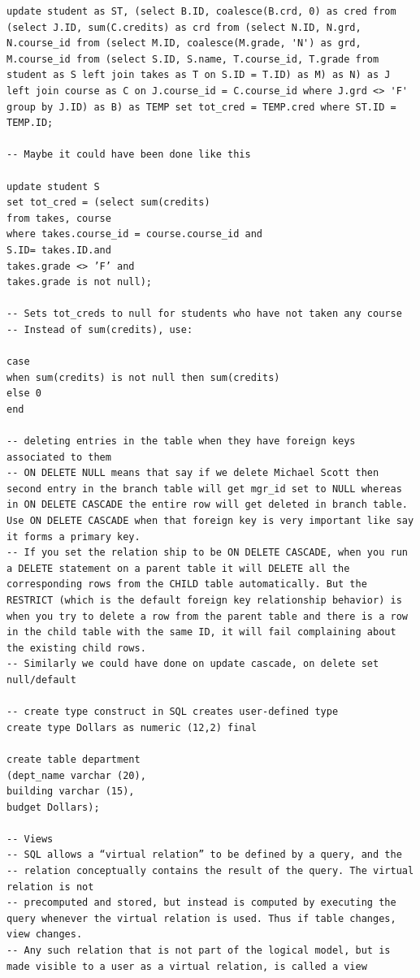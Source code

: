 \documentclass[8pt, a4paper, oneside, twocolumn]{extarticle}
\begin{document}
\begin{verbatim}
update student as ST, (select B.ID, coalesce(B.crd, 0) as cred from (select J.ID, sum(C.credits) as crd from (select N.ID, N.grd, N.course_id from (select M.ID, coalesce(M.grade, 'N') as grd, M.course_id from (select S.ID, S.name, T.course_id, T.grade from student as S left join takes as T on S.ID = T.ID) as M) as N) as J left join course as C on J.course_id = C.course_id where J.grd <> 'F' group by J.ID) as B) as TEMP set tot_cred = TEMP.cred where ST.ID = TEMP.ID;

-- Maybe it could have been done like this

update student S
set tot_cred = (select sum(credits)
from takes, course
where takes.course_id = course.course_id and
S.ID= takes.ID.and
takes.grade <> ’F’ and
takes.grade is not null);

-- Sets tot_creds to null for students who have not taken any course
-- Instead of sum(credits), use:

case
when sum(credits) is not null then sum(credits)
else 0
end

-- deleting entries in the table when they have foreign keys associated to them
-- ON DELETE NULL means that say if we delete Michael Scott then second entry in the branch table will get mgr_id set to NULL whereas in ON DELETE CASCADE the entire row will get deleted in branch table. Use ON DELETE CASCADE when that foreign key is very important like say it forms a primary key.
-- If you set the relation ship to be ON DELETE CASCADE, when you run a DELETE statement on a parent table it will DELETE all the corresponding rows from the CHILD table automatically. But the RESTRICT (which is the default foreign key relationship behavior) is when you try to delete a row from the parent table and there is a row in the child table with the same ID, it will fail complaining about the existing child rows.
-- Similarly we could have done on update cascade, on delete set null/default

-- create type construct in SQL creates user-defined type
create type Dollars as numeric (12,2) final 

create table department
(dept_name varchar (20),
building varchar (15),
budget Dollars);

-- Views
-- SQL allows a “virtual relation” to be defined by a query, and the
-- relation conceptually contains the result of the query. The virtual relation is not
-- precomputed and stored, but instead is computed by executing the query whenever the virtual relation is used. Thus if table changes, view changes.
-- Any such relation that is not part of the logical model, but is made visible to a user as a virtual relation, is called a view


\end{verbatim}
\end{document}
